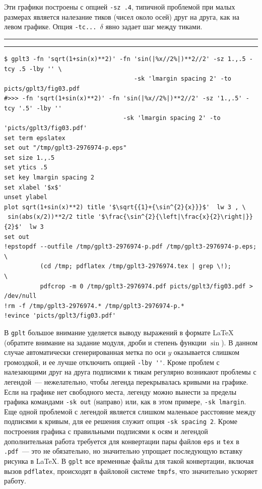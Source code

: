 \documentclass[12pt]{article}
\def\gplt{{\tt gplt}}
\def\pdf{{\tt .pdf}}
\begin{document}
\vspace{3mm} 

Эти графики построены с опцией \verb'-sz .4', типичной проблемой при малых размерах является налезание тиков (чисел около осей) друг на друга, как на левом графике.
Опция \verb'-tc... '$\delta$ явно задает шаг между тиками.\\


\noindent\rule{.45\textwidth}{1pt}\hfill {}  \hfill\rule{.45\textwidth}{1pt}

{\small
\begin{verbatim}
$ gplt3 -fn 'sqrt(1+sin(x)**2)' -fn 'sin(|%x//2%|)**2//2' -sz 1.,.5 -tcy .5 -lby '' \
                                    -sk 'lmargin spacing 2' -to picts/gplt3/fig03.pdf
#>>> -fn 'sqrt(1+sin(x)**2)' -fn 'sin(|%x//2%|)**2//2' -sz '1.,.5' -tcy '.5' -lby '' 
                                 -sk 'lmargin spacing 2' -to 'picts/gplt3/fig03.pdf'
set term epslatex 
set out "/tmp/gplt3-2976974-p.eps"
set size 1.,.5
set ytics .5
set key lmargin spacing 2
set xlabel '$x$'
unset ylabel
plot sqrt(1+sin(x)**2) title '$\sqrt{{1}+{\sin^{2}{x}}}$'  lw 3 , \
 sin(abs(x/2))**2/2 title '$\frac{\sin^{2}{\left|\frac{x}{2}\right|}}{2}$'  lw 3 
set out
!epstopdf --outfile /tmp/gplt3-2976974-p.pdf /tmp/gplt3-2976974-p.eps;        \
          (cd /tmp; pdflatex /tmp/gplt3-2976974.tex | grep \!);               \
          pdfcrop -m 0 /tmp/gplt3-2976974.pdf picts/gplt3/fig03.pdf > /dev/null
!rm -f /tmp/gplt3-2976974.* /tmp/gplt3-2976974-p.*
!evince 'picts/gplt3/fig03.pdf'
\end{verbatim}
  }
\begin{figure}
  \begin{center}
\end{center}
\end{figure}
\noindent
В \gplt{} большое внимание уделяется выводу выражений в формате \LaTeX{} (обратите внимание на задание модуля, дроби и степень функции $\sin$).
В данном случае автоматически сгенерированная метка по оси $y$ оказывается слишком громоздкой, и ее лучше отключить опцией \verb|-lby ''|.
Кроме проблем с налезающими друг на друга подписями к тикам регулярно возникают проблемы с легендой~--- нежелательно, чтобы легенда
перекрывалась кривыми на графике. Если на графике нет свободного места, легенду можно вынести за пределы графика командами \verb'-sk out' (направо)
или, как в этом примере, \verb'-sk lmargin'. Еще одной проблемой с легендой является слишком маленькое расстояние между подписями к кривым,
для ее решения служит опция \verb'-sk spacing 2'. Кроме построения графика с правильными подписями к осям и легендой дополнительная работа
требуется для конвертации пары файлов \verb'eps' и \verb'tex' в \pdf~--- это не обязательно, но значительно упрощает последующую вставку рисунка
в \LaTeX. В \gplt{} все временные файлы для такой конвертации, включая вызов \verb'pdflatex', происходят в файловой системе \verb'tmpfs',
что значительно ускоряет работу.\\
\end{document}
